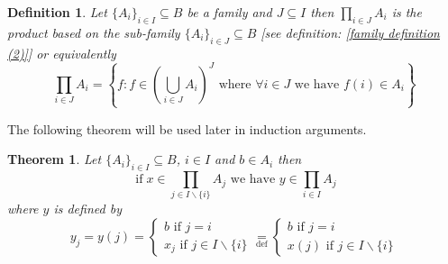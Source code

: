 \documentclass{book}
\newcommand{\equallim}{\mathop{=}\limits}
\newcommand{\tmop}[1]{\ensuremath{\operatorname{#1}}}
\newtheorem{definition}{Definition}
{\theorembodyfont{\rmfamily}\newtheorem{example}{Example}}
\newtheorem{theorem}{Theorem}
\begin{document}
\begin{definition}
  \label{product sub-product}Let $\{ A_i \}_{i \in I} \subseteq B$ be a family
  and $J \subseteq I$ then $\prod_{i \in J} A_i$ is the product based on the
  sub-family $\{ A_i \}_{i \in J} \subseteq B$ [see definition: \ref{family
  definition (2)}] or equivalently
  \[ \prod_{i \in J} A_i = \left\{ f : f \in \left( \bigcup_{i \in J} A_i
     \right)^J \text{ where } \forall i \in J \text{ we have } f (i) \in A_i
     \right\} \]
\end{definition}

The following theorem will be used later in induction arguments.

\begin{theorem}
  \label{product extension}Let $\{ A_i \}_{i \in I} \subseteq B$, $i \in I$
  and $b \in A_i$ then
  \[ \tmop{if} x \in \prod_{j \in I\backslash \{ i \}} A_j \text{ we have $y
     \in \prod_{i \in I} A_j$}  \]
  where $y$ is defined by
  \[ y_j = y (j) = \left\{\begin{array}{l}
       b \text{ if } j = i\\
       x_j \text{ if $j \in I\backslash \{ i \}$}
     \end{array}\right. \equallim_{\tmop{def}} \left\{\begin{array}{l}
       b \text{ if } j = i\\
       x (j) \text{ if $j \in I\backslash \{ i \}$}
     \end{array}\right. \]
  
\end{theorem}
\end{document}
